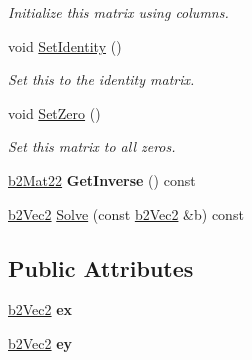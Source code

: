 \begin{DoxyCompactItemize}
\begin{DoxyCompactList}\small\item\em Initialize this matrix using columns. \end{DoxyCompactList}\item 
\hypertarget{structb2_mat22_a7192f063b771ac9ded060e41df890509}{void \hyperlink{structb2_mat22_a7192f063b771ac9ded060e41df890509}{Set\-Identity} ()}\label{structb2_mat22_a7192f063b771ac9ded060e41df890509}

\begin{DoxyCompactList}\small\item\em Set this to the identity matrix. \end{DoxyCompactList}\item 
\hypertarget{structb2_mat22_aaeae95f61cf3171ffb94703980e3594b}{void \hyperlink{structb2_mat22_aaeae95f61cf3171ffb94703980e3594b}{Set\-Zero} ()}\label{structb2_mat22_aaeae95f61cf3171ffb94703980e3594b}

\begin{DoxyCompactList}\small\item\em Set this matrix to all zeros. \end{DoxyCompactList}\item 
\hypertarget{structb2_mat22_af8d14ac8f48feb282cdd669f36ac8070}{\hyperlink{structb2_mat22}{b2\-Mat22} {\bfseries Get\-Inverse} () const }\label{structb2_mat22_af8d14ac8f48feb282cdd669f36ac8070}

\item 
\hyperlink{structb2_vec2}{b2\-Vec2} \hyperlink{structb2_mat22_ab511ad33f5abf87351581842628a9dc3}{Solve} (const \hyperlink{structb2_vec2}{b2\-Vec2} \&b) const 
\end{DoxyCompactItemize}
\subsection*{Public Attributes}
\begin{DoxyCompactItemize}
\item 
\hypertarget{structb2_mat22_abaffa5fc1d401ea36415acffa6205689}{\hyperlink{structb2_vec2}{b2\-Vec2} {\bfseries ex}}\label{structb2_mat22_abaffa5fc1d401ea36415acffa6205689}

\item 
\hypertarget{structb2_mat22_af19db58941d2cd146325ef3191b776fd}{\hyperlink{structb2_vec2}{b2\-Vec2} {\bfseries ey}}\label{structb2_mat22_af19db58941d2cd146325ef3191b776fd}

\end{DoxyCompactItemize}


